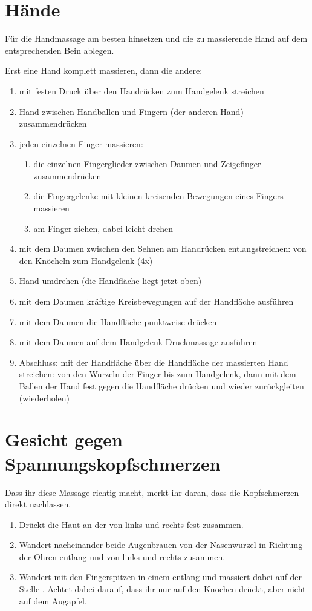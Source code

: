 \section{Hände}
Für die Handmassage am besten hinsetzen und die zu massierende Hand auf dem entsprechenden Bein ablegen.

Erst eine Hand komplett massieren, dann die andere:
\begin{enumerate}
  \item mit festen Druck über den Handrücken zum Handgelenk streichen
  \item Hand zwischen Handballen und Fingern (der anderen Hand) zu\-sam\-men\-drü\-cken
  \item jeden einzelnen Finger massieren:
    \begin{enumerate}
      \item die einzelnen Fingerglieder zwischen Daumen und Zeigefinger zu\-sam\-men\-drü\-cken
      \item die Fingergelenke mit kleinen kreisenden Bewegungen eines Fingers massieren
      \item am Finger ziehen, dabei leicht drehen
    \end{enumerate}
  \item mit dem Daumen zwischen den Sehnen am Handrücken entlangstreichen: von den Knöcheln zum Handgelenk (4x)
  \item Hand umdrehen (die Handfläche liegt jetzt oben)
  \item mit dem Daumen kräftige Kreisbewegungen auf der Handfläche ausführen
  \item mit dem Daumen die Handfläche punktweise drücken
  \item mit dem Daumen auf dem Handgelenk Druckmassage ausführen
  \item Abschluss: mit der Handfläche über die Handfläche der massierten Hand streichen: von den Wurzeln der Finger bis zum Handgelenk, dann mit dem Ballen der Hand fest gegen die Handfläche drücken und wieder zurückgleiten (wiederholen)
\end{enumerate}

\section{Gesicht gegen Spannungskopfschmerzen}

Dass ihr diese Massage richtig macht, merkt ihr daran, dass die Kopfschmerzen direkt nachlassen.

\begin{enumerate}
  \item Drückt die Haut an der  von links und rechts fest zusammen.
  \item Wandert nacheinander beide Augenbrauen von der Nasenwurzel in Richtung der Ohren entlang und  von links und rechts zusammen.
  \item Wandert mit den Fingerspitzen in einem  entlang und massiert dabei auf der Stelle . Achtet dabei darauf, dass ihr nur auf den Knochen drückt, aber nicht auf dem Augapfel.
\end{enumerate}
